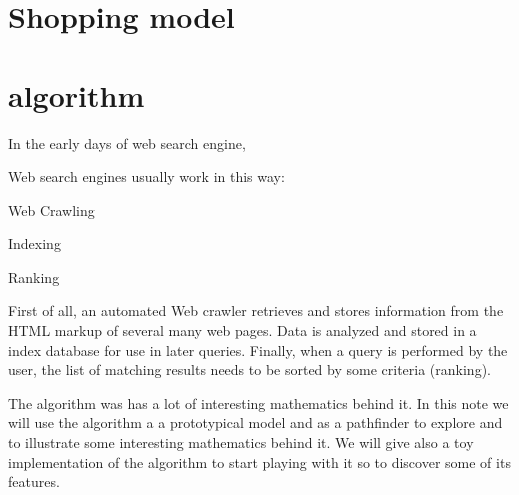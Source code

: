 \begin{refsection}
      \section{Shopping model}
      \section{\google{} \pagerank{} algorithm}
In the early days of web search engine, 


Web search engines usually work in this way:
\begin{inparaenum}[(a)]
   \item Web Crawling 
   \item Indexing 
   \item Ranking 
\end{inparaenum}
First of all, an automated Web crawler retrieves and stores information from the HTML
markup of several many web pages. 
Data is analyzed and stored in a index database for use in later queries. 
Finally, when a query is performed by the user, the list of matching results
needs to be sorted by some criteria (ranking).


The \pagerank{} algorithm was 
has a lot of interesting mathematics behind it.  
In this note we will use the \pagerank{} algorithm a  a prototypical model and
as a pathfinder to explore and to illustrate some interesting mathematics behind
it.
We will give also a toy implementation of the algorithm to start playing with
it so to discover some of its features. 



\printbibliography[heading=subbibliography]
\end{refsection}

